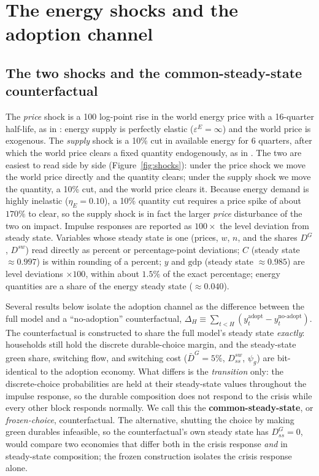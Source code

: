 \section{The energy shocks and the adoption channel}
\label{sec:experiments}

\subsection{The two shocks and the common-steady-state counterfactual}
\label{sec:counterfactual}

The \emph{price} shock is a 100 log-point rise in the world energy price with a
16-quarter half-life, as in \citet{ARS2024}: energy supply is perfectly elastic
($\varepsilon^{E}=\infty$) and the world price is exogenous. The \emph{supply}
shock is a 10\% cut in available energy for 6 quarters, after which the world
price clears a fixed quantity endogenously, as in \citet{Bayer2026}. The two are
easiest to read side by side (Figure~\ref{fig:shocks}): under the price shock we
move the world price directly and the quantity clears; under the supply shock we
move the quantity, a 10\% cut, and the world price clears it. Because energy
demand is highly inelastic ($\eta_E=0.10$), a 10\% quantity cut requires a price
spike of about $170\%$ to clear, so the supply shock is in fact the larger
\emph{price} disturbance of the two on impact. Impulse
responses are reported as $100\times$ the level deviation from steady state.
Variables whose steady state is one (prices, $w$, $n$, and the shares $D^{G}$,
$D^{sw}$) read directly as percent or percentage-point deviations; $C$ (steady
state $\approx0.997$) is within rounding of a percent; $y$ and $\mathrm{gdp}$
(steady state $\approx0.985$) are level deviations $\times100$, within about
$1.5\%$ of the exact percentage; energy quantities are a share of the energy
steady state ($\approx0.040$).

Several results below isolate the adoption channel as the difference between the
full model and a ``no-adoption'' counterfactual,
$\Delta_H\equiv\sum_{t<H}(y^{\mathrm{adopt}}_t-y^{\mathrm{no\text{-}adopt}}_t)$.
The counterfactual is constructed to share the full model's steady state
\emph{exactly}: households still hold the discrete durable-choice margin, and the
steady-state green share, switching flow, and switching cost
($\bar D^{G}=5\%$, $D^{sw}_{ss}$, $\psi_g$) are bit-identical to the adoption
economy. What differs is the \emph{transition} only: the discrete-choice
probabilities are held at their steady-state values throughout the impulse
response, so the durable composition does not respond to the crisis while every
other block responds normally. We call this the \textbf{common-steady-state}, or
\emph{frozen-choice}, counterfactual. The alternative, shutting the choice by
making green durables infeasible, so the counterfactual's own steady state has
$D^{G}_{ss}=0$, would compare two economies that differ both in the crisis
response \emph{and} in steady-state composition; the frozen construction isolates
the crisis response alone.

